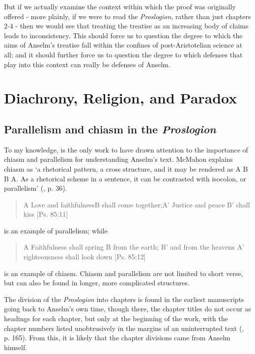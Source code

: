 \documentclass[]{birkjour}
\begin{document}
But if we actually examine the context within which the proof was originally offered - more plainly, if we were to read the \textit{Proslogion}, rather than just chapters 2-4 - then we would see that treating the treatise as an increasing body of claims leads to inconsistency. This should force us to question the degree to which the aims of Anselm's treatise fall within the confines of post-Aristotelian science at all; and it should further force us to question the degree to which defenses that play into this context can really be defenses of Anselm.

\section{Diachrony, Religion, and Paradox}
\subsection{Parallelism and chiasm in the \textit{Proslogion}}
To my knowledge, \cite{McMahon2004} is the only work to have drawn attention to the importance of chiasm and parallelism for understanding Anselm's text. McMahon explains chiasm as `a rhetorical pattern, a cross structure, and it may be rendered as A B B A. As a rhetorical scheme in a sentence, it can be contrasted with isocolon, or parallelism' (\cite{McMahon2004}, p. 36). 
\begin{quote}
A Love and faithfulness\newline B \hspace{.3in} shall come together;\newline A' Justice and peace \newline B' \hspace{.3in} shall kiss [Ps. 85:11]
\end{quote}
is an example of parallelism; while 
\begin{quote}
A Faithfulness shall spring \newline B \hspace{.3in} from the earth; \newline B' \hspace {.3in} and from the heavens \newline A' righteousness shall look down [Ps. 85:12]
\end{quote}
is an example of chiasm. Chiasm and parallelism are not limited to short verse, but can also be found in longer, more complicated structures.

The division of the \textit{Proslogion} into chapters is found in the earliest manuscripts going back to Anselm's own time, though there, the chapter titles do not occur as headings for each chapter, but only at the beginning of the work, with the chapter numbers listed unobtrusively in the margins of an uninterrupted text (\cite{McMahon2004}, p. 165). From this, it is likely that the chapter divisions came from Anselm himself.
\end{document}

